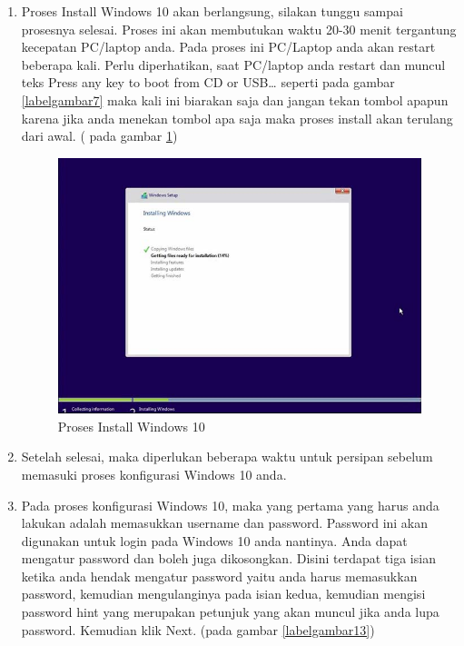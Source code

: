\begin{enumerate}
\item Proses Install Windows 10 akan berlangsung, silakan tunggu sampai prosesnya selesai. Proses ini akan membutukan waktu 20-30 menit tergantung kecepatan PC/laptop anda. Pada proses ini PC/Laptop anda akan restart beberapa kali. Perlu diperhatikan, saat PC/laptop anda restart dan muncul teks Press any key to boot from CD or USB… seperti pada gambar \ref{labelgambar7} maka kali ini biarakan saja dan jangan tekan tombol apapun karena jika anda menekan tombol apa saja maka proses install akan terulang dari awal. ( pada gambar \ref{labelgambar12})
    \begin{figure}[h!]
	\centering
	\includegraphics[scale=0.4]{figures/6.JPG}
	\caption{Proses Install Windows 10}
	\label{labelgambar12}
	\end{figure}
\item Setelah selesai, maka diperlukan beberapa waktu untuk persipan sebelum memasuki proses konfigurasi Windows 10 anda.
\item Pada proses konfigurasi Windows 10, maka yang pertama yang harus anda lakukan adalah memasukkan username dan password. Password ini akan digunakan untuk login pada Windows 10 anda nantinya. Anda dapat mengatur password dan boleh juga dikosongkan. Disini terdapat tiga isian ketika anda hendak mengatur password yaitu anda harus memasukkan password, kemudian mengulanginya pada isian kedua, kemudian mengisi password hint yang merupakan petunjuk yang akan muncul jika anda lupa password. Kemudian klik Next. (pada gambar \ref{labelgambar13})
    \begin{figure}[h!]
	\centering

\end{figure}
\end{enumerate}
